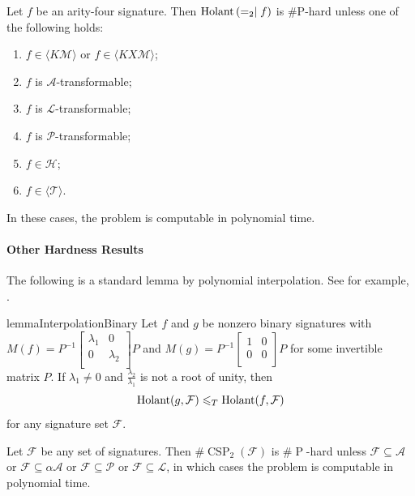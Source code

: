 \begin{theorem}\label{thm: single quaternary dichotomy}
    Let $f$ be an arity-four signature.  Then $\operatorname{Holant}\left(=_2\mid f\right)$ is
    \#P-hard unless one of the following holds:
    \begin{enumerate}
        \item $f\in\langle K\mathcal M\rangle$ or
        $f\in\langle KX\mathcal M\rangle$;
        \item $f$ is $\mathscr A$-transformable;
        \item $f$ is $\mathscr L$-transformable;
        \item $f$ is $\mathscr P$-transformable;
        \item $f\in\mathscr H$;
        \item $f\in\langle\mathscr T\rangle$.
    \end{enumerate}
    In these cases, the problem is computable in polynomial time.
\end{theorem}


\paragraph{Other Hardness Results}
The following is a standard lemma by polynomial interpolation. See for example, \cite{jcbook}.
\begin{restatable}{lemma}{InterpolationBinary}\label{lm: 2 by 2 interpolation}
    Let $f$ and $g$ be nonzero binary signatures with $M(f)=P^{-1}\left[\begin{smallmatrix}
    \lambda_1 & 0\\
    0 & \lambda_2\\
    \end{smallmatrix}\right]P$ and
    $M(g)=P^{-1}\left[\begin{smallmatrix}
    1 & 0\\
    0 & 0\\
    \end{smallmatrix}\right]P$ for some invertible matrix $P$.
    If $\lambda_1\neq 0$ and $\frac{\lambda_2}{\lambda_1}$ is not a root of unity,
    then $$\operatorname{Holant}(g, \mathcal{F})\leqslant_T\operatorname{Holant}(f, \mathcal{F})$$ for any signature set $\mathcal{F}$.
\end{restatable}

\begin{theorem}\label{thm: CSP2}
    Let $\mathcal{F}$ be any set of signatures. 
    Then $\#\operatorname{CSP}_2(\mathcal{F})$ is $\#\operatorname{P}$-hard unless $\mathcal{F}\subseteq\mathscr{A}$ or $\mathcal{F}\subseteq\alpha\mathscr{A}$ or $\mathcal{F}\subseteq\mathscr{P}$ or $\mathcal{F}\subseteq\mathscr{L}$, in which cases the problem is computable in polynomial time.
\end{theorem}

